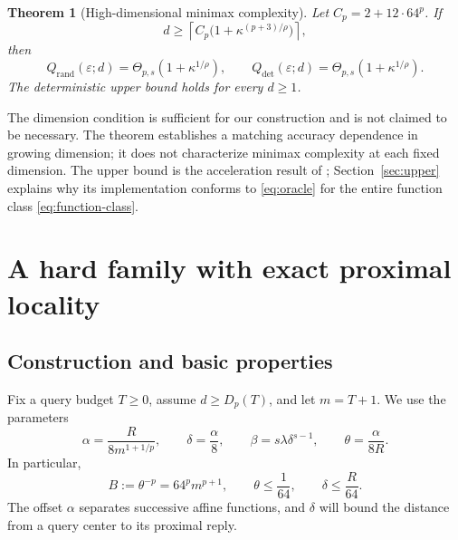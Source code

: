 \documentclass[11pt]{article}
\newtheorem{theorem}{Theorem}[section]
\theoremstyle{definition}
\theoremstyle{remark}
\newcommand{\eps}{\varepsilon}
\newcommand{\Qrand}{Q_{\mathrm{rand}}}
\newcommand{\Qdet}{Q_{\mathrm{det}}}
\begin{document}
\begin{theorem}[High-dimensional minimax complexity]\label{thm:matching}
Let $C_p=2+12\cdot64^p$. If
\begin{equation}\label{eq:dimension-corollary}
d\ge\left\lceil C_p\bigl(1+\kappa^{(p+3)/\rho}\bigr)\right\rceil,
\end{equation}
then
\begin{equation}\label{eq:matching}
\Qrand(\eps;d)=\Theta_{p,s}\!\left(1+\kappa^{1/\rho}\right),
\qquad
\Qdet(\eps;d)=\Theta_{p,s}\!\left(1+\kappa^{1/\rho}\right).
\end{equation}
The deterministic upper bound holds for every $d\ge1$.
\end{theorem}

The dimension condition is sufficient for our construction and is not
claimed to be necessary. The theorem establishes a matching accuracy
dependence in growing dimension; it does not characterize minimax
complexity at each fixed dimension. The upper bound is the acceleration
result of \citet{ABJS}; Section~\ref{sec:upper} explains why its
implementation conforms to \eqref{eq:oracle} for the entire function
class \eqref{eq:function-class}.

\section{A hard family with exact proximal locality}\label{sec:construction}

\subsection{Construction and basic properties}

Fix a query budget $T\ge0$, assume $d\ge D_p(T)$, and let $m=T+1$.
We use the parameters
\begin{equation}\label{eq:parameters}
\alpha=\frac{R}{8m^{1+1/p}},
\qquad
\delta=\frac{\alpha}{8},
\qquad
\beta=s\lambda\delta^{s-1},
\qquad
\theta=\frac{\alpha}{8R}.
\end{equation}
In particular,
\begin{equation}\label{eq:B}
B:=\theta^{-p}=64^p m^{p+1},
\qquad
\theta\le\frac1{64},
\qquad
\delta\le\frac R{64}.
\end{equation}
The offset $\alpha$ separates successive affine functions, and $\delta$
will bound the distance from a query center to its proximal reply.
\end{document}

